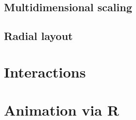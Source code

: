 \documentclass[11pt]{article}
\begin{document}
\subsection {Multidimensional scaling}

\subsection {Radial layout}

\section{Interactions}


\section{Animation via R}

\end{document}
